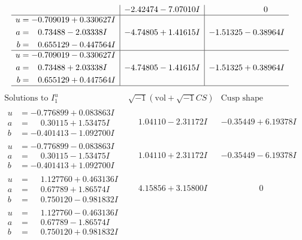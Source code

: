 \documentclass[1p]{elsarticle_modified}
\theoremstyle{definition}
\newcommand{\I}{\sqrt{-1}}
\begin{document}
$$\begin{array}{c|c|c}
 & -2.42474 - 7.07010 I & \phantom{-0.000000 } 0 \\ \hline\begin{aligned}
u &= -0.709019 + 0.330627 I \\
a &= \phantom{-}0.73488 - 2.03338 I \\
b &= \phantom{-}0.655129 - 0.447564 I\end{aligned}
 & -4.74805 + 1.41615 I & -1.51325 - 0.38964 I \\ \hline\begin{aligned}
u &= -0.709019 - 0.330627 I \\
a &= \phantom{-}0.73488 + 2.03338 I \\
b &= \phantom{-}0.655129 + 0.447564 I\end{aligned}
 & -4.74805 - 1.41615 I & -1.51325 + 0.38964 I\\
 \hline 
 \end{array}$$\newpage$$\begin{array}{c|c|c}  
\text{Solutions to }I^u_{1}& \I (\text{vol} + \sqrt{-1}CS) & \text{Cusp shape}\\
 \hline 
\begin{aligned}
u &= -0.776899 + 0.083863 I \\
a &= \phantom{-}0.30115 + 1.53475 I \\
b &= -0.401413 - 1.092700 I\end{aligned}
 & \phantom{-}1.04110 - 2.31172 I & -0.35449 + 6.19378 I \\ \hline\begin{aligned}
u &= -0.776899 - 0.083863 I \\
a &= \phantom{-}0.30115 - 1.53475 I \\
b &= -0.401413 + 1.092700 I\end{aligned}
 & \phantom{-}1.04110 + 2.31172 I & -0.35449 - 6.19378 I \\ \hline\begin{aligned}
u &= \phantom{-}1.127760 + 0.463136 I \\
a &= \phantom{-}0.67789 + 1.86574 I \\
b &= \phantom{-}0.750120 - 0.981832 I\end{aligned}
 & \phantom{-}4.15856 + 3.15800 I & \phantom{-0.000000 } 0 \\ \hline\begin{aligned}
u &= \phantom{-}1.127760 - 0.463136 I \\
a &= \phantom{-}0.67789 - 1.86574 I \\
b &= \phantom{-}0.750120 + 0.981832 I\end{aligned}

\end{array}$$
\end{document}
